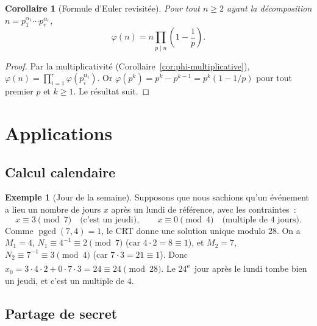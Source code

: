 \documentclass[12pt,a4paper,openany]{book}
\theoremstyle{definition}
\newtheorem{exemple}[definition]{Exemple}
\theoremstyle{plain}
\newtheorem{corollaire}[definition]{Corollaire}
\theoremstyle{remark}
\DeclareMathOperator{\pgcd}{pgcd}
\begin{document}
\begin{corollaire}[Formule d'Euler revisitée]
\label{cor:formule-euler}
Pour tout $n \geq 2$ ayant la décomposition $n = p_1^{\alpha_1} \cdots p_r^{\alpha_r}$,
\[
  \varphi(n) = n \prod_{p \mid n} \left(1 - \frac{1}{p}\right).
\]
\end{corollaire}

\begin{proof}
Par la multiplicativité (Corollaire~\ref{cor:phi-multiplicative}),
$\varphi(n) = \prod_{i=1}^{r} \varphi(p_i^{\alpha_i})$.
Or $\varphi(p^k) = p^k - p^{k-1} = p^k(1 - 1/p)$ pour tout premier $p$ et
$k \geq 1$. Le résultat suit.
\end{proof}

\section{Applications}
\label{sec:crt:applications}

\subsection{Calcul calendaire}
\label{subsec:crt:calendrier}

\begin{exemple}[Jour de la semaine]
\label{ex:crt-calendrier}
Supposons que nous sachions qu'un événement a lieu un nombre de jours $x$ après
un lundi de référence, avec les contraintes~:
\[
  x \equiv 3 \pmod{7} \quad \text{(c'est un jeudi)}, \qquad
  x \equiv 0 \pmod{4} \quad \text{(multiple de 4 jours)}.
\]
Comme $\pgcd(7, 4) = 1$, le CRT donne une solution unique modulo $28$.
On a $M_1 = 4$, $N_1 \equiv 4^{-1} \equiv 2 \pmod{7}$ (car $4 \cdot 2 = 8 \equiv 1$),
et $M_2 = 7$, $N_2 \equiv 7^{-1} \equiv 3 \pmod{4}$ (car $7 \cdot 3 = 21 \equiv 1$).
Donc $x_0 = 3 \cdot 4 \cdot 2 + 0 \cdot 7 \cdot 3 = 24 \equiv 24 \pmod{28}$.
Le $24$\textsuperscript{e}~jour après le lundi tombe bien un jeudi, et c'est un
multiple de $4$.
\end{exemple}

\subsection{Partage de secret}
\label{subsec:crt:secret}
\end{document}

